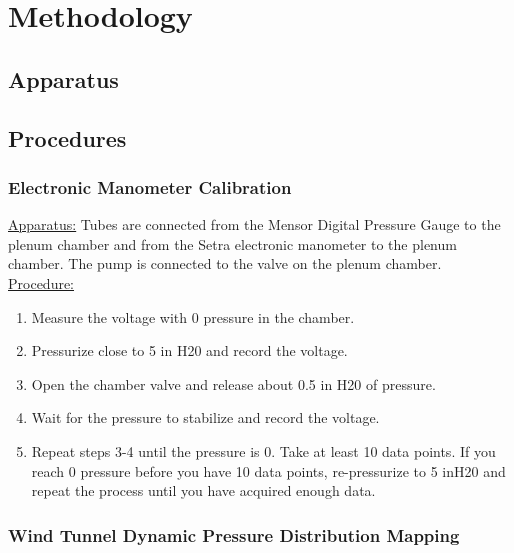 \chapter{Methodology}
\label{cp:methodology}

\section{Apparatus}\label{sec:apparatus}

\blindtext

\section{Procedures}\label{sec:procedures}

\subsection{Electronic Manometer Calibration}\label{sec:calibration}

\underline{Apparatus:} Tubes are connected from the Mensor Digital Pressure Gauge to the plenum chamber and from the Setra electronic manometer to the plenum chamber. The pump is connected to the valve on the plenum chamber. \\
\underline{Procedure:} 
\begin{enumerate}
    \item Measure the voltage with 0 pressure in the chamber. 
    \item Pressurize close to 5 in H20 and record the voltage. 
    \item Open the chamber valve and release about 0.5 in H20 of pressure.  
    \item Wait for the pressure to stabilize and record the voltage.  
    \item Repeat steps 3-4 until the pressure is 0. Take at least 10 data points. If you reach 0 pressure before you have 10 data points, re-pressurize to 5 inH20 and repeat the process until you have acquired enough data.
\end{enumerate}

\subsection{Wind Tunnel Dynamic Pressure Distribution Mapping}\label{subsec:dynamic_pressure_mapping}

